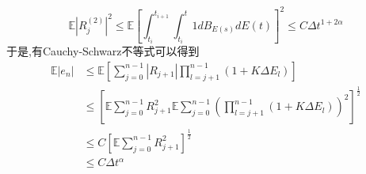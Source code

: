 \documentclass[12pt,final]{article}
\makeatletter
\numberwithin{equation}{section}
\numberwithin{figure}{section}
\numberwithin{table}{section}
\theoremstyle{plain}
\renewcommand{\proofname}{proof}
\theoremstyle{Definition}
\theoremstyle{Remark}
\renewenvironment{proof}[1][\proofname]{\par
	\pushQED{\qed}%
	\normalfont \topsep6\p@\@plus6\p@\relax
	\trivlist\item[\hskip\labelsep
	\bfseries #1\@addpunct{\,:\,}]\ignorespaces
}{%
	\popQED\endtrivlist\@endpefalse
}
\makeatother
\begin{document}
\begin{proof}
\begin{equation}
		\end{equation}
		\begin{equation}
			\mathbb{E}|R_j^{(2)}|^2 \le \mathbb{E}\left[\int_{t_i}^{t_{i+1}}\int_{t_i}^{t}1dB_{E(s)}dE(t)\right]^2 \le C \Delta t^{1+2\alpha}
		\end{equation}
		于是,有Cauchy-Schwarz不等式可以得到
		\begin{align*}
			\mathbb{E}|e_n| &\leq \mathbb{E}\left[\sum\limits_{j=0}^{n-1}|R_{j+1}|\prod_{l=j+1}^{n-1}(1+K\Delta E_l)\right]\\
			& \leq \left[\mathbb{E}\sum\limits_{j=0}^{n-1}R^2_{j+1}\mathbb{E}\sum\limits_{j=0}^{n-1}\left(\prod_{l=j+1}^{n-1}(1+K\Delta E_l)\right)^2\right]^{\frac{1}{2}}\\
			& \leq C\left[\mathbb{E}\sum\limits_{j=0}^{n-1}R^2_{j+1}\right]^{\frac{1}{2}}\\
			& \leq C\Delta t^{\alpha}
		\end{align*}


\end{proof}
\end{document}
